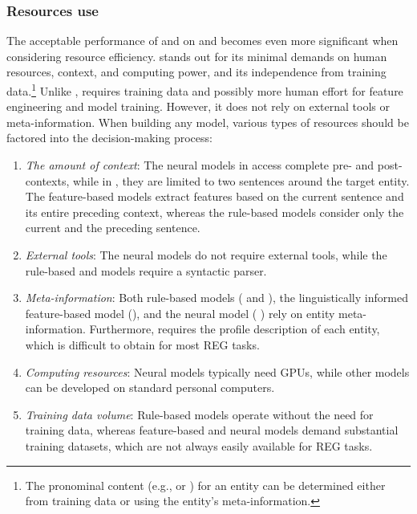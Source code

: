 \subsubsection{Resources use}

The acceptable performance of  and  on \wsj and \webnlg becomes even more significant when considering resource efficiency.  stands out for its minimal demands on human resources, context, and computing power, and its independence from training data.\footnote{The pronominal content (e.g.,  or ) for an entity can be determined either from training data or using the entity's meta-information.} Unlike ,  requires training data and possibly more human effort for feature engineering and model training. However, it does not rely on external tools or meta-information. When building any model, various types of resources should be factored into the decision-making process:


\begin{enumerate}
	
	\item \textit{The amount of context}: The neural models in \webnlg access complete pre- and post-contexts, while in \wsj, they are limited to two sentences around the target entity. The feature-based models extract features based on the current sentence and its entire preceding context, whereas the rule-based models consider only the current and the preceding sentence.
	
	\item \textit{External tools}: The neural models do not require external tools, while the rule-based and  models require a syntactic parser.
	
	\item \textit{Meta-information}: Both rule-based models ( and ), the linguistically informed feature-based model (), and the neural model ( ) rely on entity meta-information. Furthermore,  requires the profile description of each entity, which is difficult to obtain for most REG tasks.
	
	
	\item \textit{Computing resources}: Neural models typically need GPUs, while other models can be developed on standard personal computers.
	\item \textit{Training data volume}: Rule-based models operate without the need for training data, whereas feature-based and neural models demand substantial training datasets, which are not always easily available for REG tasks.
\end{enumerate}


